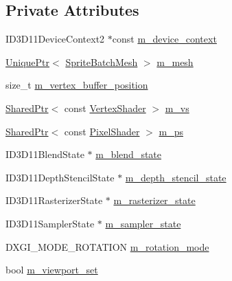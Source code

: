 \subsection*{Private Attributes}
\begin{DoxyCompactItemize}
\item 
I\+D3\+D11\+Device\+Context2 $\ast$const \hyperlink{classmage_1_1_sprite_batch_a95d4de79a01ffe5603a2cfa2eddd53b7}{m\+\_\+device\+\_\+context}
\item 
\hyperlink{namespacemage_a3316d7143a973e37adf1110f2e80ca31}{Unique\+Ptr}$<$ \hyperlink{classmage_1_1_sprite_batch_mesh}{Sprite\+Batch\+Mesh} $>$ \hyperlink{classmage_1_1_sprite_batch_a8e333637fa0af0858fd3a3efa1e59c3a}{m\+\_\+mesh}
\item 
size\+\_\+t \hyperlink{classmage_1_1_sprite_batch_afd6af84ab6728bfa907e6b8153357585}{m\+\_\+vertex\+\_\+buffer\+\_\+position}
\item 
\hyperlink{namespacemage_a1e01ae66713838a7a67d30e44c67703e}{Shared\+Ptr}$<$ const \hyperlink{classmage_1_1_vertex_shader}{Vertex\+Shader} $>$ \hyperlink{classmage_1_1_sprite_batch_aaf64bcaa1d98b1029687d2d56ea33f02}{m\+\_\+vs}
\item 
\hyperlink{namespacemage_a1e01ae66713838a7a67d30e44c67703e}{Shared\+Ptr}$<$ const \hyperlink{namespacemage_ac98506b7edd999ea43ec46fbd0330238}{Pixel\+Shader} $>$ \hyperlink{classmage_1_1_sprite_batch_ad19060aa98be03f81ed053ac152bee63}{m\+\_\+ps}
\item 
I\+D3\+D11\+Blend\+State $\ast$ \hyperlink{classmage_1_1_sprite_batch_a8b568bfe7eb54c6ccad2fe635678aa1f}{m\+\_\+blend\+\_\+state}
\item 
I\+D3\+D11\+Depth\+Stencil\+State $\ast$ \hyperlink{classmage_1_1_sprite_batch_a120d8d18acfd5c113ffb3e537ef21f41}{m\+\_\+depth\+\_\+stencil\+\_\+state}
\item 
I\+D3\+D11\+Rasterizer\+State $\ast$ \hyperlink{classmage_1_1_sprite_batch_aab9307fdb565a263ecca709b22421a9f}{m\+\_\+rasterizer\+\_\+state}
\item 
I\+D3\+D11\+Sampler\+State $\ast$ \hyperlink{classmage_1_1_sprite_batch_acb0e0af87377a714f37cdc3a66532c9b}{m\+\_\+sampler\+\_\+state}
\item 
D\+X\+G\+I\+\_\+\+M\+O\+D\+E\+\_\+\+R\+O\+T\+A\+T\+I\+ON \hyperlink{classmage_1_1_sprite_batch_ae062f178efe4a3af9c1573f8f8c4deee}{m\+\_\+rotation\+\_\+mode}
\item 
bool \hyperlink{classmage_1_1_sprite_batch_aefa38f98b30d09e3521ccdcc12bac6d0}{m\+\_\+viewport\+\_\+set}
\item 

\end{DoxyCompactItemize}
